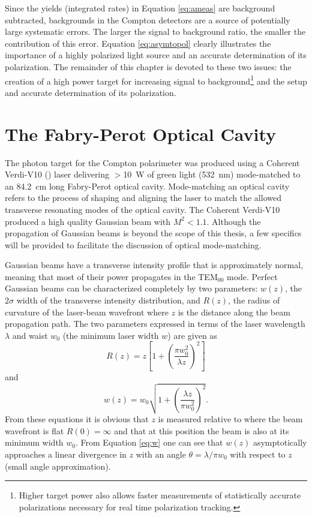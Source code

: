 Since the yields (integrated rates) in Equation \ref{eq:ameas} are background subtracted, backgrounds in the Compton detectors are a source of potentially large systematic errors. The larger the signal to background ratio, the smaller the contribution of this error. Equation \ref{eq:asymtopol} clearly illustrates the importance of a highly polarized light source and an accurate determination of its polarization. The remainder of this chapter is devoted to these two issues: the creation of a high power target for increasing signal to background\footnote{Higher target power also allows faster measurements of statistically accurate polarizations necessary for real time polarization tracking.} and the setup and accurate determination of its polarization.

\section{The Fabry-Perot Optical Cavity}
The photon target for the Compton polarimeter was produced using a Coherent Verdi-V10 (\cite{Verdi10}) laser delivering $>$10~W of green light (532~nm) mode-matched to an 84.2~cm long Fabry-Perot optical cavity. Mode-matching an optical cavity refers to the process of shaping and aligning the laser to match the allowed transverse resonating modes of the optical cavity. The Coherent Verdi-V10 produced a high quality Gaussian beam with $M^2<1.1$. Although the propagation of Gaussian beams is beyond the scope of this thesis, a few specifics will be provided to facilitate the discussion of optical mode-matching.

Gaussian beams have a transverse intensity profile that is approximately normal, meaning that most of their power propagates in the TEM$_{00}$ mode. Perfect Gaussian beams can be characterized completely by two parameters: $w(z)$, the $2\sigma$ width of the transverse intensity distribution, and $R(z)$, the radius of curvature of the laser-beam wavefront where $z$ is the distance along the beam propagation path. The two parameters expressed in terms of the laser wavelength $\lambda$ and waist $w_0$ (the minimum laser width $w$) are given as
\begin{equation}
R(z)=z\left[1+\left(\frac{\pi w_0^2}{\lambda z}\right)^2\right]
\label{eq:R}
\end{equation}
and
\begin{equation}
w(z)=w_0\sqrt{1+\left(\frac{\lambda z}{\pi w_0^2}\right)^2}.
\label{eq:w}
\end{equation}
From these equations it is obvious that $z$ is measured relative to where the beam wavefront is flat $R(0)=\infty$ and that at this position the beam is also at its minimum width $w_0$. From Equation \ref{eq:w} one can see that $w(z)$ asymptotically approaches a linear divergence in $z$ with an angle $\theta=\lambda/\pi w_0$ with respect to $z$ (small angle approximation).

